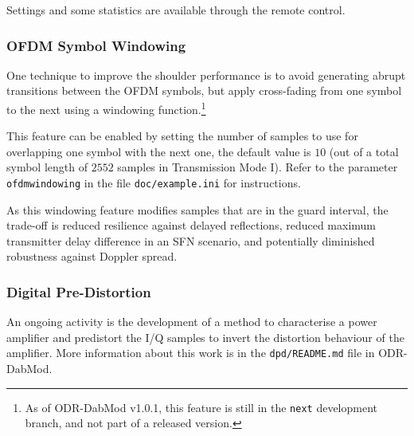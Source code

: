 Settings and some statistics are available through the remote control.

\subsubsection{OFDM Symbol Windowing}
One technique to improve the shoulder performance is to avoid generating abrupt
transitions between the OFDM symbols, but apply cross-fading from one symbol to
the next using a windowing function.\footnote{As of ODR-DabMod v1.0.1, this feature is
still in the \texttt{next} development branch, and not part of a released
version.}

This feature can be enabled by setting the number of samples to use for
overlapping one symbol with the next one, the default value is $10$ (out of a
total symbol length of $2552$ samples in Transmission Mode I). Refer to the
parameter \verb+ofdmwindowing+ in the file \verb+doc/example.ini+ for
instructions.

As this windowing feature modifies samples that are in the guard interval, the
trade-off is reduced resilience against delayed reflections, reduced maximum
transmitter delay difference in an SFN scenario, and potentially diminished
robustness against Doppler spread.

\subsubsection{Digital Pre-Distortion}
An ongoing activity is the development of a method to characterise a power
amplifier and predistort the I/Q samples to invert the distortion behaviour of
the amplifier. More information about this work is in the \verb+dpd/README.md+
file in ODR-DabMod.

